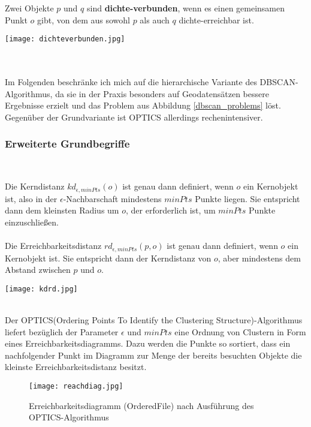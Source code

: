 \documentclass[11pt,ceqn]{book}
\begin{document}
\begin{minipage}{0.6\textwidth}\raggedright
Zwei Objekte $p$ und $q$ sind \textbf{dichte-verbunden}, wenn es einen gemeinsamen Punkt $o$ gibt, von dem aus sowohl $p$ als auch $q$ dichte-erreichbar ist.
\end{minipage}
\hfill
\begin{minipage}{0.3\textwidth}
\texttt{[image: dichteverbunden.jpg]}
\end{minipage}
\\~\\
Im Folgenden beschränke ich mich auf die hierarchische Variante des DBSCAN-Algorithmus, da sie in der Praxis besonders auf Geodatensätzen bessere Ergebnisse erzielt und das Problem aus Abbildung \ref{dbscan_problems} löst. Gegenüber der Grundvariante ist OPTICS allerdings rechenintensiver.

\subsubsection{Erweiterte Grundbegriffe}~
\begin{minipage}{0.50\textwidth}\raggedright
Die Kerndistanz $kd_{\epsilon, minPts}(o)$ ist genau dann definiert, wenn $o$ ein Kernobjekt ist, also in der $\epsilon$-Nachbarschaft mindestens $minPts$ Punkte liegen. Sie entspricht dann dem kleinsten Radius um $o$, der erforderlich ist, um $minPts$ Punkte einzuschließen.\\~\\

Die Erreichbarkeitsdistanz $rd_{\epsilon, minPts}(p ,o)$ ist genau dann definiert, wenn $o$ ein Kernobjekt ist. Sie entspricht dann der Kerndistanz von $o$, aber mindestens dem Abstand zwischen $p$ und $o$.
\end{minipage}
\hfill
\begin{minipage}{0.45\textwidth}
\texttt{[image: kdrd.jpg]}
\end{minipage}
\\
Der OPTICS(Ordering Points To Identify the Clustering Structure)-Algorithmus \cite{optics} liefert bezüglich der Parameter $\epsilon$ und $minPts$ eine Ordnung von Clustern in Form eines Erreichbarkeitsdiagramms. Dazu werden die Punkte so sortiert, dass ein nachfolgender Punkt im Diagramm zur Menge der bereits besuchten Objekte die kleinste Erreichbarkeitsdistanz besitzt.

\begin{figure}[H]
\centering
\texttt{[image: reachdiag.jpg]}
\caption{Erreichbarkeitsdiagramm (OrderedFile) nach Ausführung des OPTICS-Algorithmus\protect\footnotemark}
\end{figure}
\end{document}
